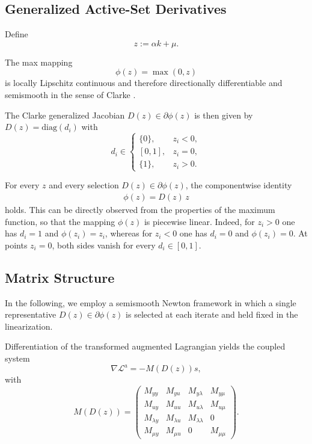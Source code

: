 \documentclass[11pt]{article}
\newcommand{\DLag}{\mathcal L^a}
\newtheorem{proposition}{Proposition}
\begin{document}
\subsection{Generalized Active-Set Derivatives}
\label{sec:generalized}

Define
\[
z:=\alpha k+\mu.
\]

The max mapping
\[
\phi(z)=\max(0,z)
\]
is locally Lipschitz continuous and therefore directionally differentiable and semismooth in the sense of Clarke \cite{clarke1983}.

The Clarke generalized Jacobian $D(z)\in \partial \phi(z)$ is then given by $D(z)=\text{diag}(d_i)$ with 
\[
d_i \in
\begin{cases}
\{0\}, & z_i<0,
\\
[0,1], & z_i=0,
\\
\{1\}, & z_i>0.
\end{cases}
\]

For every $z$ and every selection $D(z)\in\partial\phi(z)$,
the componentwise identity 
\begin{align}
\label{eq:iden}
    \phi(z)=D(z)\,z
\end{align}
holds. This can be directly observed from the properties of the maximum function, so that the mapping $\phi(z)$ is piecewise linear. Indeed, for $z_i>0$ one has $d_i=1$ and
$\phi(z_i)=z_i$, whereas for $z_i<0$ one has
$d_i=0$ and $\phi(z_i)=0$. At points $z_i=0$,
both sides vanish for every $d_i\in[0,1]$.


\subsection{Matrix Structure}

In the following, we employ a semismooth Newton framework in which a single representative
$D(z)\in\partial \phi(z)$ is selected at each iterate and held fixed in the
linearization.

Differentiation of the transformed augmented Lagrangian yields the coupled system
\[
\nabla \DLag = -M(D(z))s,
\]
with
\[
M(D(z))=
\begin{pmatrix}
M_{yy} & M_{yu} & M_{y\lambda} & M_{y\mu}
\\
M_{uy} & M_{uu} & M_{u\lambda} & M_{u\mu}
\\
M_{\lambda y} & M_{\lambda u} & M_{\lambda\lambda} & 0
\\
M_{\mu y} & M_{\mu u} & 0 & M_{\mu\mu}
\end{pmatrix}.
\]
\end{document}
